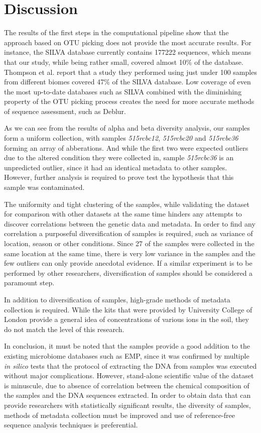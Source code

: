 \documentclass[12pt,twocolumn]{article} %
\begin{document}
%
%

\section{Discussion}
The results of the first steps in the computational pipeline show that the approach based on OTU picking does not provide the most accurate results. For instance, the SILVA database currently contains 177222 sequences, which means that our study, while being rather small, covered almost 10\% of the database. Thompson et al.\cite{Thompson2017} report that a study they performed using just under 100 samples from different biomes covered  47\% of the SILVA database. Low coverage of even the most up-to-date databases such as SILVA combined with the diminishing property of the OTU picking process creates the need for more accurate methods of sequence assessment, such as Deblur\cite{Amir}. 
\par
As we can see from the results of alpha and beta diversity analysis, our samples form a uniform collection, with samples \textit{515rcbc12}, \textit{515rcbc20} and \textit{515rcbc36} forming an array of abberations. And while the first two were expected outliers due to the altered condition they were collected in, sample \textit{515rcbc36} is an unpredicted outlier, since it had an identical metadata to other samples. However, further analysis is required to prove test the hypothesis that this sample was contaminated.
\par
The uniformity and tight clustering of the samples, while validating the dataset for comparison with other datasets at the same time hinders any attempts to discover correlations between the genetic data and metadata. In order to find any correlation a purposeful diversification of samples is required, such as variance of location, season or other conditions. Since 27 of the samples were collected in the same location at the same time, there is very low variance in the samples and the few outliers can only provide anecdotal evidence. If a similar experiment is to be performed by other researchers, diversification of samples should be considered a paramount step.
\par
In addition to diversification of samples, high-grade methods of metadata collection is required. While the kits that were provided by University College of London provide a general idea of concentrations of various ions in the soil, they do not match the level of this research.
\par
In conclusion, it must be noted that the samples provide a good addition to the existing microbiome databases such as EMP, since it was confirmed by multiple \textit{in silico} tests that the protocol of extracting the DNA from samples was executed without major complications. However, stand-alone scientific value of the dataset is minuscule, due to absence of correlation between the chemical composition of the samples and the DNA sequences extracted. In order to obtain data that can provide researchers with statistically significant results, the diversity of samples, methods of metadata collection must be improved and use of reference-free sequence analysis techniques is preferential.
 



\end{document}
